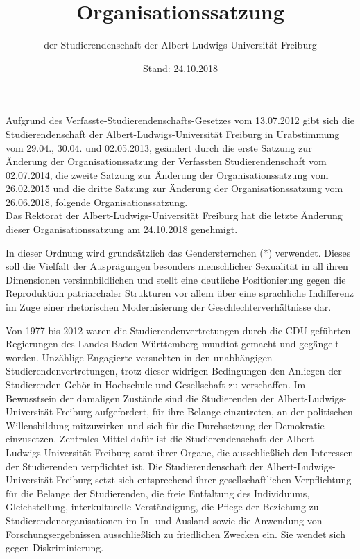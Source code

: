 \documentclass[fontsize=12pt,parskip=half]{scrartcl}
\begin{document}
\subject{Lesefassung}
\title{Organisationssatzung}
\subtitle{der Studierendenschaft der Albert-Ludwigs-Universität Freiburg}
\date{Stand: 24.10.2018}
\maketitle

\pagebreak

\tableofcontents

\vspace*{\fill}

Aufgrund des Verfasste-Studierendenschafts-Gesetzes vom 13.07.2012 gibt sich die
Studierendenschaft der Albert-Ludwigs-Universität Freiburg in Urabstimmung vom
29.04., 30.04. und 02.05.2013, geändert durch die erste Satzung zur Änderung der
Organisationssatzung der Verfassten Studierendenschaft vom 02.07.2014, die
zweite Satzung zur Änderung der Organisationssatzung vom 26.02.2015 und die
dritte Satzung zur Änderung der Organisationssatzung vom 26.06.2018, folgende
Organisationssatzung.\\
Das Rektorat der Albert-Ludwigs-Universität Freiburg hat die letzte Änderung
dieser Organisationssatzung am 24.10.2018 genehmigt.

In dieser Ordnung wird grundsätzlich das Gendersternchen (*) verwendet. Dieses
soll die Vielfalt der Ausprägungen besonders menschlicher Sexualität in all
ihren Dimensionen versinnbildlichen und stellt eine deutliche Positionierung
gegen die Reproduktion patriarchaler Strukturen vor allem über eine sprachliche
Indifferenz im Zuge einer rhetorischen Modernisierung der
Geschlechterverhältnisse dar.

\pagebreak


Von 1977 bis 2012 waren die Studierendenvertretungen durch die CDU-geführten
Regierungen des Landes Baden-Württemberg mundtot gemacht und gegängelt worden.
Unzählige Engagierte versuchten in den unabhängigen Studierendenvertretungen,
trotz dieser widrigen Bedingungen den Anliegen der Studierenden Gehör in
Hochschule und Gesellschaft zu verschaffen. Im Bewusstsein der damaligen
Zustände sind die Studierenden der Albert-Ludwigs-Universität Freiburg
aufgefordert, für ihre Belange einzutreten, an der politischen Willensbildung
mitzuwirken und sich für die Durchsetzung der Demokratie einzusetzen. Zentrales
Mittel dafür ist die Studierendenschaft der Albert-Ludwigs-Universität Freiburg
samt ihrer Organe, die ausschließlich den Interessen der Studierenden
verpflichtet ist.
Die Studierendenschaft der Albert-Ludwigs-Universität Freiburg setzt sich
entsprechend ihrer gesellschaftlichen Verpflichtung für die Belange der
Studierenden, die freie Entfaltung des Individuums, Gleichstellung,
interkulturelle Verständigung, die Pflege der Beziehung zu
Studierendenorganisationen im In- und Ausland sowie die Anwendung von
Forschungsergebnissen ausschließlich zu friedlichen Zwecken ein. Sie wendet sich
gegen Diskriminierung.
\end{document}
